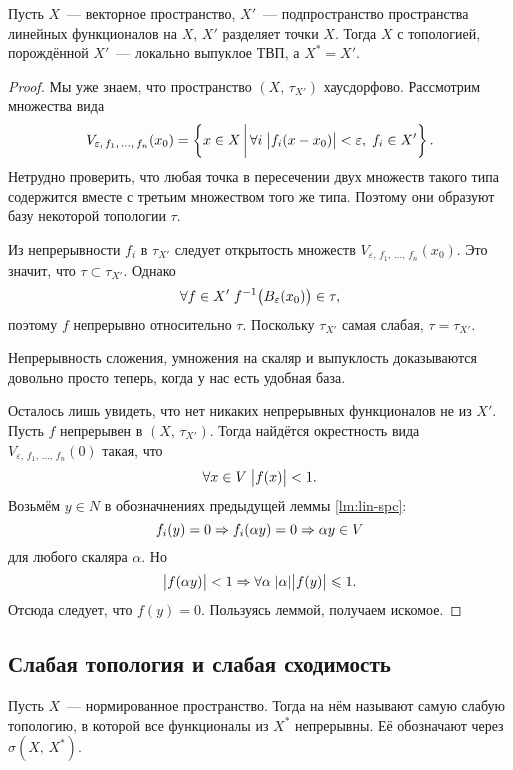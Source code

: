\documentclass{notes}
\begin{document}
	\begin{thm}
		Пусть $X$~--- векторное пространство, $X'$~--- подпространство пространства линейных функционалов на $X$, $X'$ разделяет точки $X$. Тогда $X$ с топологией, порождённой $X'$~--- локально выпуклое ТВП, а $X^{*} = X'$.
		\begin{proof}
			Мы уже знаем, что пространство $(X, \, \tau_{X'})$ хаусдорфово. Рассмотрим множества вида
			\[
				V_{\varepsilon, \, f_1, \, \ldots, \, f_n}(x_0) = \left\{x \in X \, \bigg | \, \forall i \; \big|f_i(x - x_0)\big| < \varepsilon, \; f_i \in X'\right\}.
			\]
			Нетрудно проверить, что любая точка в пересечении двух множеств такого типа содержится вместе с третьим множеством того же типа. Поэтому они образуют базу некоторой топологии $\tau$.

			Из непрерывности $f_i$ в $\tau_{X'}$ следует открытость множеств $V_{\varepsilon, \, f_1, \, \ldots, \, f_n}(x_0)$. Это значит, что $\tau \subset \tau_{X'}$. Однако 
			\[
				\forall f \in X' \; f^{-1}\big(B_{\varepsilon}(x_0)\big) \in \tau,
			\]
			поэтому $f$ непрерывно относительно $\tau$. Поскольку $\tau_{X'}$ самая слабая, $\tau = \tau_{X'}$.

			Непрерывность сложения, умножения на скаляр и выпуклость доказываются довольно просто теперь, когда у нас есть удобная база. 

			Осталось лишь увидеть, что нет никаких непрерывных функционалов не из $X'$. Пусть $f$ непрерывен в $(X, \, \tau_{X'})$. Тогда найдётся окрестность вида $V_{\varepsilon, \, f_1, \, \ldots, \, f_n}(0)$ такая, что
			\[
				\forall x \in V \; \big|f(x)\big| < 1.
			\]
			Возьмём $y \in N$ в обозначнениях предыдущей леммы \ref{lm:lin-spc}:
			\[
				f_i(y) = 0 \Rightarrow f_i(\alpha y) = 0 \Rightarrow \alpha y \in V
			\]
			для любого скаляра $\alpha$. Но
			\[
				\big|f(\alpha y)\big| < 1 \Rightarrow \forall \alpha \; |\alpha| \big|f(y)\big| \leqslant 1.
			\]
			Отсюда следует, что $f(y) = 0$. Пользуясь леммой, получаем искомое.
		\end{proof}
	\end{thm}

\subsection{Слабая топология и слабая сходимость}

	\begin{de}
		Пусть $X$~--- нормированное пространство. Тогда  на нём называют самую слабую топологию, в которой все функционалы из $X^{*}$ непрерывны. Её обозначают через $\sigma(X, \, X^{*})$.
	\end{de}
\end{document}
